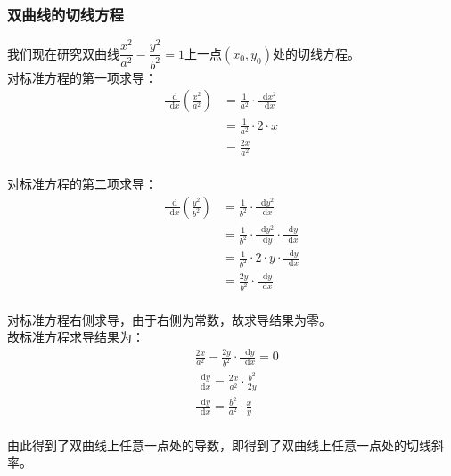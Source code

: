 \documentclass[UTF8]{ctexart}
\newcommand*{\dif}{\mathop{}\!\mathrm{d}}
\begin{document}
\subsubsection{双曲线的切线方程}
    我们现在研究双曲线$\dfrac{x^2}{a^2}-\dfrac{y^2}{b^2}=1$上一点$(x_0,y_0)$处的切线方程。\\[5mm]
    对标准方程的第一项求导：
    \setcounter{equation}{0}
    \begin{align}
        \frac{\dif}{\dif x}\left(\frac{x^2}{a^2}\right)
        &=\frac{1}{a^2}\cdot\frac{\dif x^2}{\dif x}~~~~~~~~\\[4mm]
        &=\frac{1}{a^2}\cdot 2\cdot x\\[4mm]
        &=\frac{2x}{a^2}
    \end{align}\\
    对标准方程的第二项求导：
    \setcounter{equation}{0}
    \begin{align}
        \frac{\dif}{\dif x}\left(\frac{y^2}{b^2}\right)
        &=\frac{1}{b^2}\cdot\frac{\dif y^2}{\dif x}\\[4mm]
        &=\frac{1}{b^2}\cdot\frac{\dif y^2}{\dif y}\cdot\frac{\dif y}{\dif x}\\[4mm]
        &=\frac{1}{b^2}\cdot 2\cdot y\cdot \frac{\dif y}{\dif x}\\[4mm]
        &=\frac{2y}{b^2}\cdot\frac{\dif y}{\dif x}
    \end{align}\\
    对标准方程右侧求导，由于右侧为常数，故求导结果为零。\\[12mm]
    故标准方程求导结果为：
    \begin{align}
        &\frac{2x}{a^2}-\frac{2y}{b^2}\cdot\frac{\dif y}{\dif x}=0\\[5mm]
        &\frac{\dif y}{\dif x}=\frac{2x}{a^2}\cdot\frac{b^2}{2y}\\[5mm]
        &\frac{\dif y}{\dif x}=\frac{b^2}{a^2}\cdot\frac{x}{y}
    \end{align}\\
    由此得到了双曲线上任意一点处的导数，即得到了双曲线上任意一点处的切线斜率。

\newpage
\end{document}
